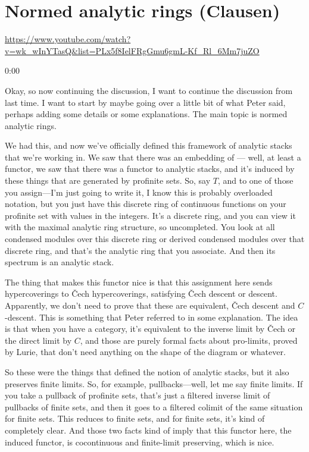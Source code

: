 
\section{\ufs Normed analytic rings (Clausen)}

\url{https://www.youtube.com/watch?v=wk_wInYTasQ&list=PLx5f8IelFRgGmu6gmL-Kf_Rl_6Mm7juZO}
\renewcommand{\yt}[2]{\href{https://www.youtube.com/watch?v=wk_wInYTasQ&list=PLx5f8IelFRgGmu6gmL-Kf_Rl_6Mm7juZO&t=#1}{#2}}
\vspace{1em}

\begin{unfinished}{0:00}

Okay, so now continuing the discussion, I want to continue the discussion from last time. I want to start by maybe going over a little bit of what Peter said, perhaps adding some details or some explanations. The main topic is normed analytic rings. 

We had this, and now we've officially defined this framework of analytic stacks that we're working in. We saw that there was an embedding of --- well, at least a functor, we saw that there was a functor to analytic stacks, and it's induced by these things that are generated by profinite sets. So, say $T$, and to one of those you assign---I'm just going to write it, I know this is probably overloaded notation, but you just have this discrete ring of continuous functions on your profinite set with values in the integers. It's a discrete ring, and you can view it with the maximal analytic ring structure, so uncompleted. You look at all condensed modules over this discrete ring or derived condensed modules over that discrete ring, and that's the analytic ring that you associate. And then its spectrum is an analytic stack.

The thing that makes this functor nice is that this assignment here sends hypercoverings to Čech hypercoverings, satisfying Čech descent or descent. Apparently, we don't need to prove that these are equivalent, Čech descent and $C$-descent. This is something that Peter referred to in some explanation. The idea is that when you have a category, it's equivalent to the inverse limit by Čech or the direct limit by $C$, and those are purely formal facts about pro-limits, proved by Lurie, that don't need anything on the shape of the diagram or whatever.

So these were the things that defined the notion of analytic stacks, but it also preserves finite limits. So, for example, pullbacks---well, let me say finite limits. If you take a pullback of profinite sets, that's just a filtered inverse limit of pullbacks of finite sets, and then it goes to a filtered colimit of the same situation for finite sets. This reduces to finite sets, and for finite sets, it's kind of completely clear. And those two facts kind of imply that this functor here, the induced functor, is cocontinuous and finite-limit preserving, which is nice.


\end{unfinished}
